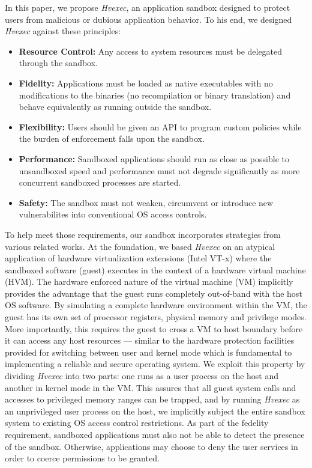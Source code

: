 \documentclass{article}
\newcommand{\PROJNAME}{\textit{Hvexec}}
\begin{document}
In this paper, we propose \PROJNAME{}, an application sandbox designed to protect users from malicious or dubious application behavior.
To his end, we designed \PROJNAME{} against these principles:
\begin{itemize}
    \item \textbf{Resource Control:}
        Any access to system resources must be delegated through the sandbox.
    \item \textbf{Fidelity:}
        Applications must be loaded as native executables with no modifications to the binaries
        (no recompilation or binary translation) and behave equivalently as running outside the sandbox.
    \item \textbf{Flexibility:}
        Users should be given an API to program custom policies while the burden of enforcement falls upon the sandbox.
    \item \textbf{Performance:}
        Sandboxed applications should run as close as possible to unsandboxed speed
        and performance must not degrade significantly as more concurrent sandboxed processes are started.
    \item \textbf{Safety:}
        The sandbox must not weaken, circumvent or introduce new vulnerabilites into conventional OS access controls.
\end{itemize}
To help meet those requirements, our sandbox incorporates strategies from various related works.
At the foundation, we based \PROJNAME{} on an atypical application of hardware virtualization extensions (Intel VT-x) where
the sandboxed software (guest) executes in the context of a hardware virtual machine (HVM).
The hardware enforced nature of the virtual machine (VM) implicitly provides the advantage that the guest runs completely out-of-band with the host OS software.
By simulating a complete hardware environment within the VM, the guest has its own set of processor registers, physical memory and privilege modes.
More importantly, this requires the guest to cross a VM to host boundary before it can access any host resources
— similar to the hardware protection facilities provided for switching between user and kernel mode which is fundamental to implementing a reliable and secure operating system.
We exploit this property by dividing \PROJNAME{} into two parts: one runs as a user process on the host and another in kernel mode in the VM.
This assures that all guest system calls and accesses to privileged memory ranges can be trapped, and
by running \PROJNAME{} as an unprivileged user process on the host, we implicitly subject the
entire sandbox system to existing OS access control restrictions.
As part of the fedelity requirement, sandboxed applications must also not be able to detect the presence of the sandbox.
Otherwise, applications may choose to deny the user services in order to coerce permissions to be granted.
\end{document}
